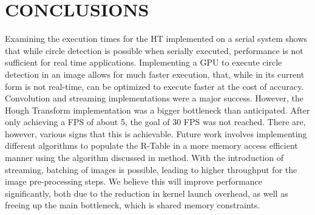\documentclass[12pt]{article}
\begin{document}
\section{\MakeUppercase{Conclusions}}
\label{sec:Conclusions}
\noindent
Examining the execution times for the HT implemented on a serial system shows that while circle detection is possible when serially executed, performance is not sufficient for real time applications.
Implementing a GPU to execute circle detection in an image allows for much faster execution, that, while in its current form is not real-time, can be optimized to execute faster at the cost of accuracy. Convolution and streaming implementations were a major success. However, the Hough Transform implementation was a bigger bottleneck than anticipated. After only achieving a FPS of about 5, the goal of 30 FPS was not reached. There are, however, various signs that this is achievable.
Future work involves implementing different algorithms to populate the R-Table in a more memory access efficient manner using the algorithm discussed in method. 
With the introduction of streaming, batching of images is possible, leading to higher throughput for the image pre-processing steps. We believe this will improve performance significantly, both due to the reduction in kernel launch overhead, as well as freeing up the main bottleneck, which is shared memory constraints.





\end{document}
